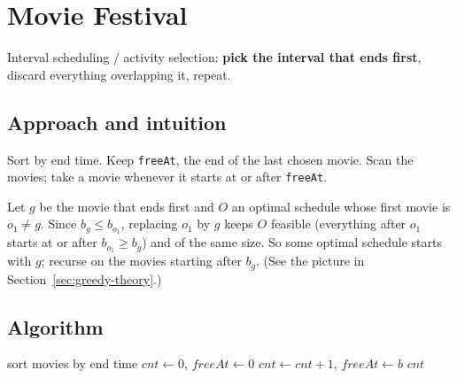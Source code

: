 \section{Movie Festival}
\label{sec:g-movie}


\begin{patternbox}
Interval scheduling / activity selection: \textbf{pick the interval that
ends first}, discard everything overlapping it, repeat.
\end{patternbox}

\subsection*{Approach and intuition}

Sort by end time. Keep \texttt{freeAt}, the end of the last chosen movie.
Scan the movies; take a movie whenever it starts at or after
\texttt{freeAt}.

\begin{ideabox}
Let $g$ be the movie that ends first and $O$ an optimal schedule whose first
movie is $o_1\ne g$. Since $b_g\le b_{o_1}$, replacing $o_1$ by $g$ keeps $O$
feasible (everything after $o_1$ starts at or after $b_{o_1}\ge b_g$) and of
the same size. So some optimal schedule starts with $g$; recurse on the
movies starting after $b_g$. (See the picture in
Section~\ref{sec:greedy-theory}.)
\end{ideabox}

\subsection*{Algorithm}
\begin{algorithmic}[1]
\State sort movies by end time
\State $cnt\gets0$, $freeAt\gets0$
   \State $cnt\gets cnt+1$, $freeAt\gets b$ \EndIf
\EndFor
\State \Return $cnt$
\end{algorithmic}


